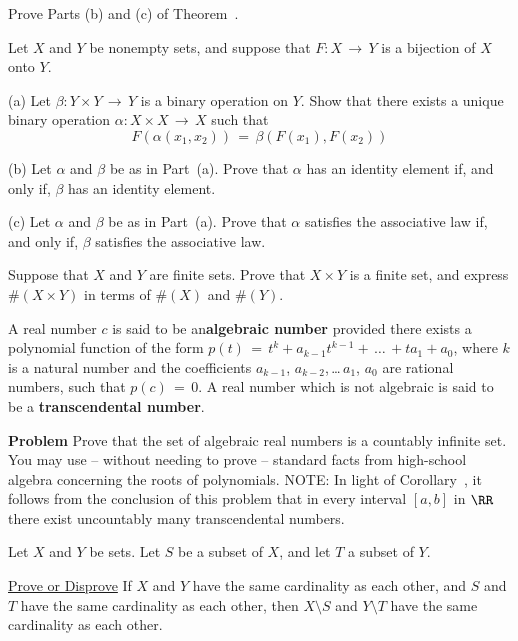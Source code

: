 \V
\V

\noindent \ExAt Prove Parts (b) and (c) of Theorem~.

\V
\V

\noindent \ExAu Let $X$ and $Y$ be nonempty sets, and suppose that $F:X \,{\rightarrow}\, Y$ is a bijection of $X$ onto $Y$.

\V

        (a) Let ${\beta}:Y{\times}Y \,{\rightarrow}\, Y$ is a binary operation on $Y$.
    Show that there exists a unique binary operation ${\alpha}:X{\times}X \,{\rightarrow}\, X$ such that
        \begin{displaymath}
        F({\alpha}(x_{1},x_{2})) \,=\, {\beta}(F(x_{1}),F(x_{2}))
        \end{displaymath}

\V

        (b) Let ${\alpha}$ and ${\beta}$ be as in Part~(a). Prove that ${\alpha}$ has an identity element if, and only if, ${\beta}$ has an identity element.

\V

       (c) Let ${\alpha}$ and ${\beta}$ be as in Part~(a). Prove that ${\alpha}$ satisfies the associative law if, and only if, ${\beta}$ satisfies the associative law.

\V
\V

\noindent \ExAv Suppose that $X$ and $Y$ are finite sets. Prove that $X{\times}Y$ is a finite set, and express $\#(X{\times}Y)$ in terms of $\#(X)$ and $\#(Y)$.

\V
\V

\noindent {} A real number $c$ is said to be an{\bf algebraic number} provided there exists a polynomial function of the form $p(t) \,=\, t^{k} + a_{k-1}t^{k-1} + \,{\ldots}\,+ ta_{1} + a_{0}$, where $k$ is a natural number and the coefficients $a_{k-1}$, $a_{k-2}$,\,{\ldots}\,$a_{1}$, $a_{0}$ are rational numbers, such that $p(c) \,=\, 0$. A real number which is not algebraic is said to be a {\bf transcendental number}.

    {\bf Problem} Prove that the set of algebraic real numbers is a countably infinite set.
    You may use -- without needing to prove -- standard facts from high-school algebra concerning the roots of polynomials.
        NOTE: In light of Corollary~, it follows from the conclusion of this problem that in every interval $[a,b]$ in ${\RR}$ there exist uncountably many transcendental numbers.

\V
\V

\noindent \ExAx Let $X$ and $Y$ be sets. Let $S$ be a subset of $X$, and let $T$ a subset of $Y$.

        \underline{Prove or Disprove} If $X$ and $Y$ have the same cardinality as each other, and $S$ and $T$ have the same cardinality as each other,
    then $X{\setminus}S$ and $Y{\setminus}T$ have the same cardinality as each other.











